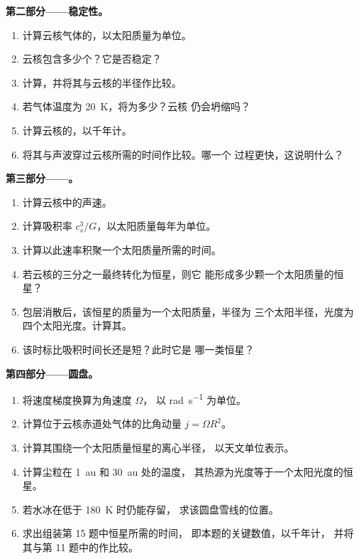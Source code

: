 \begin{problem}
\noindent\textbf{第二部分——稳定性。}
\begin{enumerate}[resume]
  \item 计算云核气体的，以太阳质量为单位。
  \item 云核包含多少个？它是否稳定？
  \item 计算，并将其与云核的半径作比较。
  \item 若气体温度为 \qty{20}{K}，将为多少？云核
        仍会坍缩吗？
  \item 计算云核的，以千年计。
  \item 将其与声波穿过云核所需的时间作比较。哪一个
        过程更快，这说明什么？
\end{enumerate}

\noindent\textbf{第三部分——。}
\begin{enumerate}[resume]
  \item 计算云核中的声速。
  \item 计算吸积率 $c_s^3/G$，以太阳质量每年为单位。
  \item 计算以此速率积聚一个太阳质量所需的时间。
  \item 若云核的三分之一最终转化为恒星，则它
        能形成多少颗一个太阳质量的恒星？
  \item 包层消散后，该恒星的质量为一个太阳质量，半径为
        三个太阳半径，光度为四个太阳光度。计算其。
  \item 该时标比吸积时间长还是短？此时它是
        哪一类恒星？
\end{enumerate}

\noindent\textbf{第四部分——圆盘。}
\begin{enumerate}[resume]
  \item 将速度梯度换算为角速度 $\Omega$，
        以 \unit{rad.s^{-1}} 为单位。
  \item 计算位于云核赤道处气体的比角动量
        $j = \Omega R^2$。
  \item 计算其围绕一个太阳质量恒星的离心半径，
        以天文单位表示。
  \item 计算尘粒在 \qty{1}{au} 和 \qty{30}{au} 处的温度，
        其热源为光度等于一个太阳光度的恒星。
  \item 若水冰在低于 \qty{180}{K} 时仍能存留，
        求该圆盘雪线的位置。
  \item 求出组装第 15 题中恒星所需的时间，
        即本题的关键数值，以千年计，
        并将其与第 11 题中的作比较。
\end{enumerate}
\end{problem}
